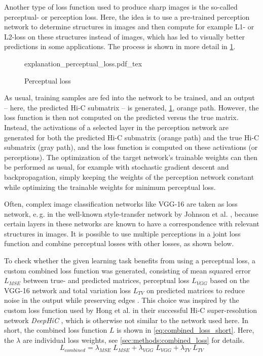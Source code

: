 Another type of loss function used to produce sharp images is the so-called perceptual- or perception loss.
Here, the idea is to use a pre-trained perception network to determine structures in images and then compute for example L1- or L2-loss on these structures instead of images,
which has led to visually better predictions in some applications.
The process is shown in more detail in \cref{fig:improve:perceptual_loss}. 
\begin{figure}[hbt]
    \small
    \centering
    {explanation_perceptual_loss.pdf_tex}%
    \caption{Perceptual loss}
    \label{fig:improve:perceptual_loss}
\end{figure}

As usual, training samples are fed into the network to be trained, and an output -- here, the predicted Hi-C submatrix -- is generated,
\cref{fig:improve:perceptual_loss}, orange path.
However, the loss function is then not computed on the predicted versus the true matrix. 
Instead, the activations of a selected layer in the perception network are generated for both the predicted Hi-C submatrix (orange path)
and the true Hi-C submatrix (gray path), and the loss function is computed on these activations (or perceptions).
The optimization of the target network's trainable weights can then be performed as usual, for example with stochastic gradient descent and backpropagation, 
simply keeping the weights of the perception network constant while optimizing the trainable weights for minimum perceptual loss.

Often, complex image classification networks like VGG-16 \cite{Simonyan2015} are taken as loss network, 
e.\,g. in the well-known style-transfer network by Johnson et al. \cite{Johnson2016},
because certain layers in these networks are known to have a correspondence with relevant structures in images.
It is possible to use multiple perceptions in a joint loss function \cite{Johnson2016} and combine perceptual losses with other losses, as shown below.

To check whether the given learning task benefits from using a perceptual loss, a custom combined loss function was generated,
consisting of mean squared error $L_\mathit{MSE}$ between true- and predicted matrices, perceptual loss $L_\mathit{VGG}$ based on the VGG-16 network 
and total variation loss $L_\mathit{TV}$ on predicted matrices to reduce noise in the output while preserving edges \cite{Rudin1992}. 
This choice was inspired by the custom loss function used by Hong et al. in their successful Hi-C super-resolution network \emph{DeepHiC} \cite{Hong2020},
which is otherwise not similar to the network used here.
In short, the combined loss function $L$ is shown in \cref{eq:combined_loss_short}. 
Here, the $\lambda$ are individual loss weights, see \cref{sec:methods:combined_loss} for details.
\begin{equation}
 L_\mathit{combined} = \lambda_\mathit{MSE} \; L_\mathit{MSE} + \lambda_\mathit{VGG} \; L_\mathit{VGG} + \lambda_\mathit{TV} \; L_\mathit{TV} \label{eq:combined_loss_short}
\end{equation}


